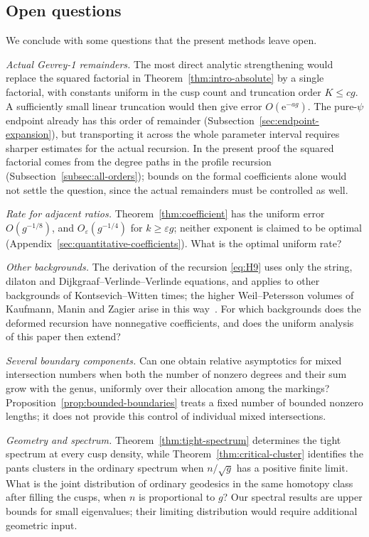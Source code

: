 \subsection{Open questions}
We conclude with some questions that the present methods leave open.

\emph{Actual Gevrey-1 remainders.} The most direct analytic strengthening would replace the squared factorial in Theorem~\ref{thm:intro-absolute} by a single factorial, with constants uniform in the cusp count and truncation order $K\le cg$. A sufficiently small linear truncation would then give error $O(\mathrm e^{-ag})$. The pure-$\psi$ endpoint already has this order of remainder (Subsection~\ref{sec:endpoint-expansion}), but transporting it across the whole parameter interval requires sharper estimates for the actual recursion. In the present proof the squared factorial comes from the degree paths in the profile recursion (Subsection~\ref{subsec:all-orders}); bounds on the formal coefficients alone would not settle the question, since the actual remainders must be controlled as well.

\emph{Rate for adjacent ratios.} Theorem~\ref{thm:coefficient} has the
uniform error $O(g^{-1/8})$, and $O_\varepsilon(g^{-1/4})$ for
$k\ge\varepsilon g$; neither exponent is claimed to be optimal
(Appendix~\ref{sec:quantitative-coefficients}). What is the optimal
uniform rate?

\emph{Other backgrounds.} The derivation of the recursion
\eqref{eq:H9} uses only the string, dilaton and
Dijkgraaf--Verlinde--Verlinde equations, and applies to other
backgrounds of Kontsevich--Witten times; the higher Weil--Petersson
volumes of Kaufmann, Manin and Zagier arise in this way~\cite{KMZ,ManZ}.
For which backgrounds does the deformed recursion have nonnegative
coefficients, and does the uniform analysis of this paper then extend?

\emph{Several boundary components.} Can one obtain relative asymptotics
for mixed intersection numbers when both the number of nonzero degrees
and their sum grow with the genus, uniformly over their allocation among
the markings? Proposition~\ref{prop:bounded-boundaries} treats a fixed
number of bounded nonzero lengths; it does not provide this control of
individual mixed intersections.

\emph{Geometry and spectrum.} Theorem~\ref{thm:tight-spectrum} determines
the tight spectrum at every cusp density, while
Theorem~\ref{thm:critical-cluster} identifies the pants clusters in the
ordinary spectrum when $n/\sqrt g$ has a positive finite limit.
What is the joint distribution
of ordinary geodesics in the same homotopy class after filling the
cusps, when $n$ is proportional to $g$? Our spectral results are upper bounds
for small eigenvalues; their limiting distribution would require
additional geometric input.
